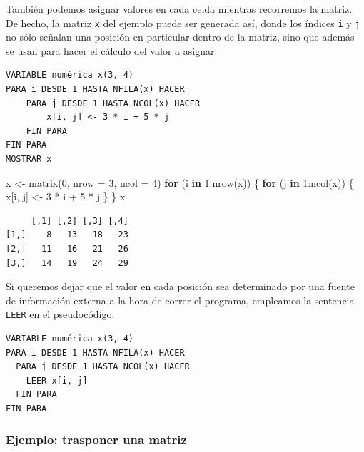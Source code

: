 \documentclass[
]{book}
\newenvironment{Shaded}{\begin{snugshade}}{\end{snugshade}}
\newcommand{\AttributeTok}[1]{\textcolor[rgb]{0.77,0.63,0.00}{#1}}
\newcommand{\ControlFlowTok}[1]{\textcolor[rgb]{0.13,0.29,0.53}{\textbf{#1}}}
\newcommand{\DecValTok}[1]{\textcolor[rgb]{0.00,0.00,0.81}{#1}}
\newcommand{\FunctionTok}[1]{\textcolor[rgb]{0.00,0.00,0.00}{#1}}
\newcommand{\NormalTok}[1]{#1}
\newcommand{\OtherTok}[1]{\textcolor[rgb]{0.56,0.35,0.01}{#1}}
\newcommand{\SpecialCharTok}[1]{\textcolor[rgb]{0.00,0.00,0.00}{#1}}
\begin{document}
También podemos asignar valores en cada celda mientras recorremos la matriz. De hecho, la matriz \texttt{x} del ejemplo puede ser generada así, donde los índices \texttt{i} y \texttt{j} no sólo señalan una posición en particular dentro de la matriz, sino que además se usan para hacer el cálculo del valor a asignar:

\begin{verbatim}
VARIABLE numérica x(3, 4)
PARA i DESDE 1 HASTA NFILA(x) HACER
    PARA j DESDE 1 HASTA NCOL(x) HACER
        x[i, j] <- 3 * i + 5 * j
    FIN PARA
FIN PARA
MOSTRAR x
\end{verbatim}

\begin{Shaded}
\begin{Highlighting}[]
\NormalTok{x }\OtherTok{\textless{}{-}} \FunctionTok{matrix}\NormalTok{(}\DecValTok{0}\NormalTok{, }\AttributeTok{nrow =} \DecValTok{3}\NormalTok{, }\AttributeTok{ncol =} \DecValTok{4}\NormalTok{)}
\ControlFlowTok{for}\NormalTok{ (i }\ControlFlowTok{in} \DecValTok{1}\SpecialCharTok{:}\FunctionTok{nrow}\NormalTok{(x)) \{}
    \ControlFlowTok{for}\NormalTok{ (j }\ControlFlowTok{in} \DecValTok{1}\SpecialCharTok{:}\FunctionTok{ncol}\NormalTok{(x)) \{}
\NormalTok{        x[i, j] }\OtherTok{\textless{}{-}} \DecValTok{3} \SpecialCharTok{*}\NormalTok{ i }\SpecialCharTok{+} \DecValTok{5} \SpecialCharTok{*}\NormalTok{ j}
\NormalTok{    \}}
\NormalTok{\}}
\NormalTok{x}
\end{Highlighting}
\end{Shaded}

\begin{verbatim}
     [,1] [,2] [,3] [,4]
[1,]    8   13   18   23
[2,]   11   16   21   26
[3,]   14   19   24   29
\end{verbatim}

Si queremos dejar que el valor en cada posición sea determinado por una fuente de información externa a la hora de correr el programa, empleamos la sentencia \texttt{LEER} en el pseudocódigo:

\begin{verbatim}
VARIABLE numérica x(3, 4)
PARA i DESDE 1 HASTA NFILA(x) HACER
  PARA j DESDE 1 HASTA NCOL(x) HACER
    LEER x[i, j]
  FIN PARA
FIN PARA
\end{verbatim}

\hypertarget{ejemplo-trasponer-una-matriz}{%
\subsubsection{Ejemplo: trasponer una matriz}\label{ejemplo-trasponer-una-matriz}}
\end{document}
